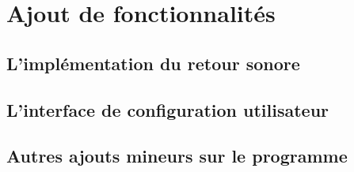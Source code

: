 \section{Ajout de fonctionnalités}

\subsection{L'implémentation du retour sonore}
\paragraph{}



\subsection{L'interface de configuration utilisateur}

\subsection{Autres ajouts mineurs sur le programme}
